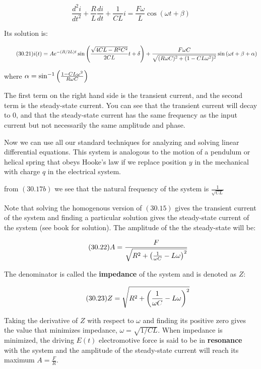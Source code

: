 \documentclass{article}
\begin{document}
\[ \tag{30.17b} \frac{d^2 i}{dt^2} + \frac{R}{L}\frac{di}{dt} + \frac{1}{CL}i = \frac{F\omega}{L} \cos{(\omega t + \beta)} \]

Its solution is:

\[ \tag{30.21} i(t) = Ae^{-(R/2L)t} \sin{\left(\frac{\sqrt{4CL - R^2 C^2}}{2CL}t + \delta\right)} + \frac{F \omega C}{\sqrt{(R \omega C)^2 + (1 - CL \omega^2)^2}}\sin{(\omega t + \beta + \alpha)} \]

where $\alpha = \sin^{-1}{\left(\frac{1 - CL\omega^2}{R \omega C}\right)}$

The first term on the right hand side is the transient current, and the second term is the steady-state current. You can see that the transient current will decay to $0$, and that the steady-state current has the same frequency as the input current but not necessarily the same amplitude and phase.

Now we can use all our standard techniques for analyzing and solving linear differential equations. This system is analogous to the motion of a pendulum or helical spring that obeys Hooke's law if we replace position $y$ in the mechanical with charge $q$ in the electrical system.

from $(30.17b)$ we see that the natural frequency of the system is $\frac{1}{\sqrt{CL}}$

Note that solving the homogenous version of $(30.15)$ gives the transient current of the system and finding a particular solution gives the steady-state current of the system (see book for solution). The amplitude of the the steady-state will be:

\[ \tag{30.22} A = \frac{F}{\sqrt{R^2 + \left(\frac{1}{\omega C} - L \omega\right)^2}} \]

The denominator is called the \textbf{impedance} of the system and is denoted as $Z$:

\[ \tag{30.23} Z = \sqrt{R^2 + \left(\frac{1}{\omega C} - L \omega\right)^2} \]

Taking the derivative of $Z$ with respect to $\omega$ and finding its positive zero gives the value that minimizes impedance, $\omega = \sqrt{1/CL}$. When impedance is minimized, the driving $E(t)$ electromotive force is said to be in \textbf{resonance} with the system and the amplitude of the steady-state current will reach its maximum $A = \frac{F}{R}$.
\end{document}
